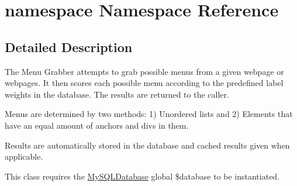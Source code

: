 \hypertarget{namespacenamespace}{\section{namespace Namespace Reference}
\label{namespacenamespace}
}


\subsection{Detailed Description}
The Menu Grabber attempts to grab possible menus from a given webpage or webpages. It then scores each possible menu according to the predefined label weights in the database. The results are returned to the caller.

Menus are determined by two methods\-: 1) Unordered lists and 2) Elements that have an equal amount of anchors and divs in them.

Results are automatically stored in the database and cached results given when applicable.

This class requires the \hyperlink{classMySQLDatabase}{My\-S\-Q\-L\-Database} global \$database to be instantiated. 